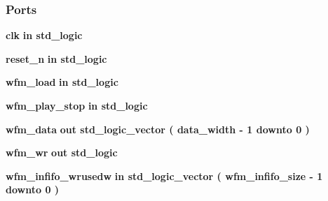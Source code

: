 \subsubsection*{Ports}
 \begin{DoxyCompactItemize}
\item 
{\bf clk}  {\bfseries {\bfseries \textcolor{keywordflow}{in}\textcolor{vhdlchar}{ }}} {\bfseries \textcolor{comment}{std\+\_\+logic}\textcolor{vhdlchar}{ }} 
\item 
{\bf reset\+\_\+n}  {\bfseries {\bfseries \textcolor{keywordflow}{in}\textcolor{vhdlchar}{ }}} {\bfseries \textcolor{comment}{std\+\_\+logic}\textcolor{vhdlchar}{ }} 
\item 
{\bf wfm\+\_\+load}  {\bfseries {\bfseries \textcolor{keywordflow}{in}\textcolor{vhdlchar}{ }}} {\bfseries \textcolor{comment}{std\+\_\+logic}\textcolor{vhdlchar}{ }} 
\item 
{\bf wfm\+\_\+play\+\_\+stop}  {\bfseries {\bfseries \textcolor{keywordflow}{in}\textcolor{vhdlchar}{ }}} {\bfseries \textcolor{comment}{std\+\_\+logic}\textcolor{vhdlchar}{ }} 
\item 
{\bf wfm\+\_\+data}  {\bfseries {\bfseries \textcolor{keywordflow}{out}\textcolor{vhdlchar}{ }}} {\bfseries \textcolor{comment}{std\+\_\+logic\+\_\+vector}\textcolor{vhdlchar}{ }\textcolor{vhdlchar}{(}\textcolor{vhdlchar}{ }\textcolor{vhdlchar}{ }\textcolor{vhdlchar}{ }\textcolor{vhdlchar}{ }{\bfseries {\bf data\+\_\+width}} \textcolor{vhdlchar}{-\/}\textcolor{vhdlchar}{ } \textcolor{vhdldigit}{1} \textcolor{vhdlchar}{ }\textcolor{keywordflow}{downto}\textcolor{vhdlchar}{ }\textcolor{vhdlchar}{ } \textcolor{vhdldigit}{0} \textcolor{vhdlchar}{ }\textcolor{vhdlchar}{)}\textcolor{vhdlchar}{ }} 
\item 
{\bf wfm\+\_\+wr}  {\bfseries {\bfseries \textcolor{keywordflow}{out}\textcolor{vhdlchar}{ }}} {\bfseries \textcolor{comment}{std\+\_\+logic}\textcolor{vhdlchar}{ }} 
\item 
{\bf wfm\+\_\+infifo\+\_\+wrusedw}  {\bfseries {\bfseries \textcolor{keywordflow}{in}\textcolor{vhdlchar}{ }}} {\bfseries \textcolor{comment}{std\+\_\+logic\+\_\+vector}\textcolor{vhdlchar}{ }\textcolor{vhdlchar}{(}\textcolor{vhdlchar}{ }\textcolor{vhdlchar}{ }\textcolor{vhdlchar}{ }\textcolor{vhdlchar}{ }{\bfseries {\bf wfm\+\_\+infifo\+\_\+size}} \textcolor{vhdlchar}{-\/}\textcolor{vhdlchar}{ } \textcolor{vhdldigit}{1} \textcolor{vhdlchar}{ }\textcolor{keywordflow}{downto}\textcolor{vhdlchar}{ }\textcolor{vhdlchar}{ } \textcolor{vhdldigit}{0} \textcolor{vhdlchar}{ }\textcolor{vhdlchar}{)}\textcolor{vhdlchar}{ }} 

\end{DoxyCompactItemize}
